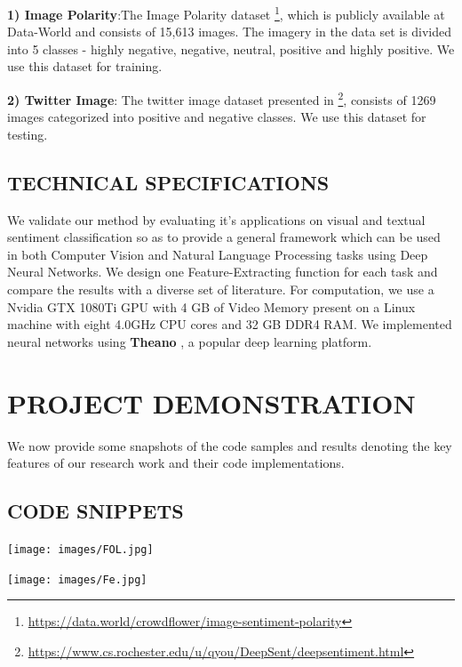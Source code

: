 \documentclass[12pt,a4paper]{article}
\begin{document}
\textbf{1) Image Polarity}:The Image Polarity dataset \footnote{%
\url{https://data.world/crowdflower/image-sentiment-polarity}}, which is publicly available at Data-World and consists of 15,613 images. The imagery in the data set is divided into 5 classes - highly negative, negative, neutral, positive and highly positive. We use this dataset for training.

\textbf{2) Twitter Image}: The twitter image dataset presented in \cite{You:2015} \footnote{\url{https://www.cs.rochester.edu/u/qyou/DeepSent/deepsentiment.html}}, consists of 1269 images categorized into positive and negative classes. We use this dataset for testing.



\subsection{TECHNICAL SPECIFICATIONS}
We validate our method by evaluating it's applications on visual and textual sentiment classification so as to provide a general framework which can be used in both Computer Vision and Natural Language Processing tasks using Deep Neural Networks. We design one Feature-Extracting function for each task and compare the results with a diverse set of literature. For computation, we use a Nvidia GTX 1080Ti GPU with 4 GB of Video Memory present on a Linux machine with eight 4.0GHz CPU cores and 32 GB DDR4 RAM. We implemented neural networks using \textbf{Theano}
, a popular deep learning platform.


\newpage
\section{\uppercase{PROJECT DEMONSTRATION}}
We now provide some snapshots of the code samples and results denoting the key features of our research work and their code implementations.

\subsection{CODE SNIPPETS}

\begin{center}
\texttt{[image: images/FOL.jpg]}
\end{center}

\begin{center}
\texttt{[image: images/Fe.jpg]}
\end{center}
\end{document}
